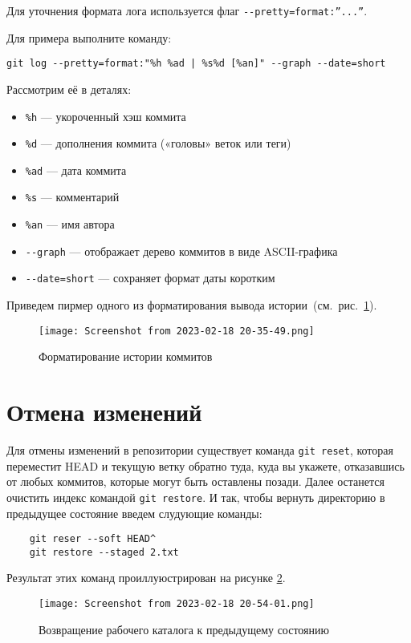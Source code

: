 Для уточнения формата лога используется флаг \verb|--pretty=format:”...”|.

Для примера выполните команду:
\begin{verbatim}
git log --pretty=format:"%h %ad | %s%d [%an]" --graph --date=short
\end{verbatim}

Рассмотрим её в деталях:
\begin{itemize}
	\item \texttt{\%h} — укороченный хэш коммита
	\item \texttt{\%d} — дополнения коммита («головы» веток или теги)
	\item \texttt{\%ad} — дата коммита
	\item \texttt{\%s} — комментарий
	\item \texttt{\%an} — имя автора
	\item \verb|--graph| — отображает дерево коммитов в виде ASCII-графика
	\item \verb|--date=short| — сохраняет формат даты коротким
\end{itemize}

Приведем пирмер одного из форматирования вывода
истории~(см.~рис.~\ref{fig:git:flog}).

\begin{figure}[h!tp]
	\centering
	\texttt{[image: Screenshot from 2023-02-18 20-35-49.png]}
	\caption{Форматирование истории коммитов}
	\label{fig:git:flog}
\end{figure}

\section{Отмена изменений}
Для отмены изменений в репозитории существует команда \texttt{git~reset},
которая переместит HEAD и текущую ветку обратно туда, куда вы укажете,
отказавшись от любых коммитов, которые могут быть оставлены позади.
Далее останется очистить индекс командой \texttt{git restore}.
И так, чтобы вернуть директорию в предыдущее состояние введем
слудующие команды:
\begin{verbatim}
	git reser --soft HEAD^
	git restore --staged 2.txt
\end{verbatim}
Результат этих команд проиллуюстрирован на рисунке \ref{fig:git:reset}.

\begin{figure}[h!tp]
	\centering
	\texttt{[image: Screenshot from 2023-02-18 20-54-01.png]}
	\caption{Возвращение рабочего каталога к предыдущему состоянию}
	\label{fig:git:reset}
\end{figure}

